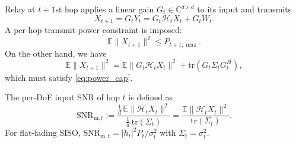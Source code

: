 \documentclass[journal]{IEEEtran}
\begin{document}
Relay at $t+1$st hop applies a linear gain $G_t\in\mathbb{C}^{d\times d}$ to its input and transmits
\begin{equation}
    X_{t+1} = G_t Y_t = G_t \mathcal{H}_t X_t + G_t W_t.
    \label{eq:af_tx}
\end{equation}
A per-hop transmit-power constraint is imposed:
\begin{equation}
    \mathbb{E}\|X_{t+1}\|^2 \leq P_{t+1,\max}.
    \label{eq:power_cap}
\end{equation}
On the other hand, we have 
\begin{equation}
\mathbb{E}\|X_{t+1}\|^2 = \mathbb{E}\|G_t \mathcal{H}_t X_t\|^2 +\mathrm{tr}(G_t \Sigma_t G_t^{\!H}),
    \label{eq:af_power_out}
\end{equation}
which must satisfy \eqref{eq:power_cap}.

The per-DoF input SNR of hop $t$ is defined as
\begin{equation}
    \mathrm{SNR}_{\mathrm{in},t} := \frac{ \tfrac{1}{d}\,\mathbb{E}\|\mathcal{H}_t X_t\|^2 }{ \tfrac{1}{d}\,\mathrm{tr}(\Sigma_t) } = \frac{ \mathbb{E}\|\mathcal{H}_t X_t\|^2 }{ \mathrm{tr}(\Sigma_t) }.
    \label{eq:snr_in_def}
\end{equation}
For flat-fading SISO, $\mathrm{SNR}_{\mathrm{in},t}=|h_t|^2 P_t/\sigma_t^2$ with $\Sigma_t=\sigma_t^2$. %
\end{document}
